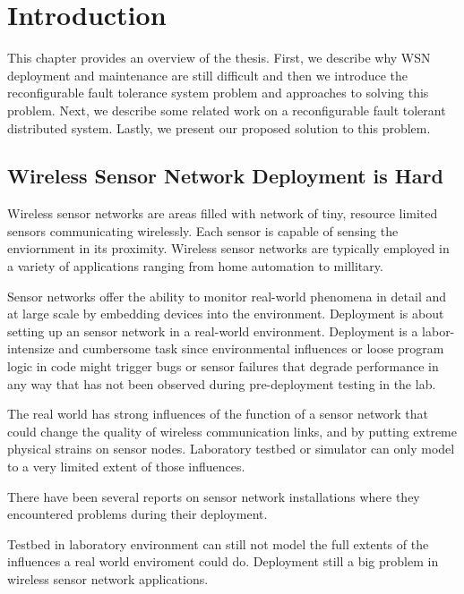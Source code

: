 \cleardoublepage
\singlespacing
\chapter{Introduction}
\label{c:intro}
\doublespacing\nointerlineskip

This chapter provides an overview of the thesis. First, we describe why
WSN deployment and maintenance are still difficult and then we introduce the
reconfigurable fault tolerance system problem and approaches to solving this
problem. Next, we describe some related work on a reconfigurable fault tolerant distributed system. Lastly, we present our proposed solution to this problem.

\section{Wireless Sensor Network Deployment is Hard}

Wireless sensor networks are areas filled with network of tiny, resource
limited sensors communicating wirelessly. Each sensor is capable of sensing the
enviornment in its proximity. Wireless sensor networks are typically employed in
a variety of applications ranging from home automation to millitary.

Sensor networks offer the ability to monitor real-world phenomena in detail and
at large scale by embedding devices into the environment. Deployment is
about setting up an sensor network in a real-world environment. Deployment is
a labor-intensize and cumbersome task since environmental influences or
loose program logic in code might trigger bugs or sensor failures that
degrade performance in any way that has not been observed during pre-deployment
testing in the lab.

The real world has strong influences of the function of a sensor network that
could change the quality of wireless communication links, and by putting
extreme physical strains on sensor nodes. Laboratory testbed or simulator can 
only model to a very limited extent of those influences.

There have been several reports on sensor network installations where they
encountered problems during their
deployment\cite{Barrenetxea2008}\cite{Polastre2004}\cite{Arora2004}\cite{Tateson2005}\cite{Padhy2005}\cite{Stoianov2007}\cite{Tolle2005}\cite{Werner-Allen2006a}.

Testbed in laboratory environment can still not model the full extents of the
influences a real world enviroment could do. Deployment still a big problem in
wireless sensor network applications.

